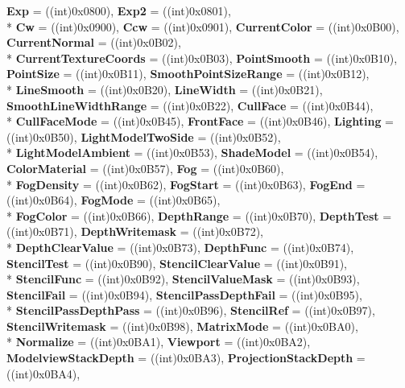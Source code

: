 \begin{DoxyCompactItemize}
{\bfseries Exp} = ((int)0x0800), 
{\bfseries Exp2} = ((int)0x0801), 
\\*
{\bfseries Cw} = ((int)0x0900), 
{\bfseries Ccw} = ((int)0x0901), 
{\bfseries Current\-Color} = ((int)0x0\-B00), 
{\bfseries Current\-Normal} = ((int)0x0\-B02), 
\\*
{\bfseries Current\-Texture\-Coords} = ((int)0x0\-B03), 
{\bfseries Point\-Smooth} = ((int)0x0\-B10), 
{\bfseries Point\-Size} = ((int)0x0\-B11), 
{\bfseries Smooth\-Point\-Size\-Range} = ((int)0x0\-B12), 
\\*
{\bfseries Line\-Smooth} = ((int)0x0\-B20), 
{\bfseries Line\-Width} = ((int)0x0\-B21), 
{\bfseries Smooth\-Line\-Width\-Range} = ((int)0x0\-B22), 
{\bfseries Cull\-Face} = ((int)0x0\-B44), 
\\*
{\bfseries Cull\-Face\-Mode} = ((int)0x0\-B45), 
{\bfseries Front\-Face} = ((int)0x0\-B46), 
{\bfseries Lighting} = ((int)0x0\-B50), 
{\bfseries Light\-Model\-Two\-Side} = ((int)0x0\-B52), 
\\*
{\bfseries Light\-Model\-Ambient} = ((int)0x0\-B53), 
{\bfseries Shade\-Model} = ((int)0x0\-B54), 
{\bfseries Color\-Material} = ((int)0x0\-B57), 
{\bfseries Fog} = ((int)0x0\-B60), 
\\*
{\bfseries Fog\-Density} = ((int)0x0\-B62), 
{\bfseries Fog\-Start} = ((int)0x0\-B63), 
{\bfseries Fog\-End} = ((int)0x0\-B64), 
{\bfseries Fog\-Mode} = ((int)0x0\-B65), 
\\*
{\bfseries Fog\-Color} = ((int)0x0\-B66), 
{\bfseries Depth\-Range} = ((int)0x0\-B70), 
{\bfseries Depth\-Test} = ((int)0x0\-B71), 
{\bfseries Depth\-Writemask} = ((int)0x0\-B72), 
\\*
{\bfseries Depth\-Clear\-Value} = ((int)0x0\-B73), 
{\bfseries Depth\-Func} = ((int)0x0\-B74), 
{\bfseries Stencil\-Test} = ((int)0x0\-B90), 
{\bfseries Stencil\-Clear\-Value} = ((int)0x0\-B91), 
\\*
{\bfseries Stencil\-Func} = ((int)0x0\-B92), 
{\bfseries Stencil\-Value\-Mask} = ((int)0x0\-B93), 
{\bfseries Stencil\-Fail} = ((int)0x0\-B94), 
{\bfseries Stencil\-Pass\-Depth\-Fail} = ((int)0x0\-B95), 
\\*
{\bfseries Stencil\-Pass\-Depth\-Pass} = ((int)0x0\-B96), 
{\bfseries Stencil\-Ref} = ((int)0x0\-B97), 
{\bfseries Stencil\-Writemask} = ((int)0x0\-B98), 
{\bfseries Matrix\-Mode} = ((int)0x0\-B\-A0), 
\\*
{\bfseries Normalize} = ((int)0x0\-B\-A1), 
{\bfseries Viewport} = ((int)0x0\-B\-A2), 
{\bfseries Modelview\-Stack\-Depth} = ((int)0x0\-B\-A3), 
{\bfseries Projection\-Stack\-Depth} = ((int)0x0\-B\-A4), 

\end{DoxyCompactItemize}
